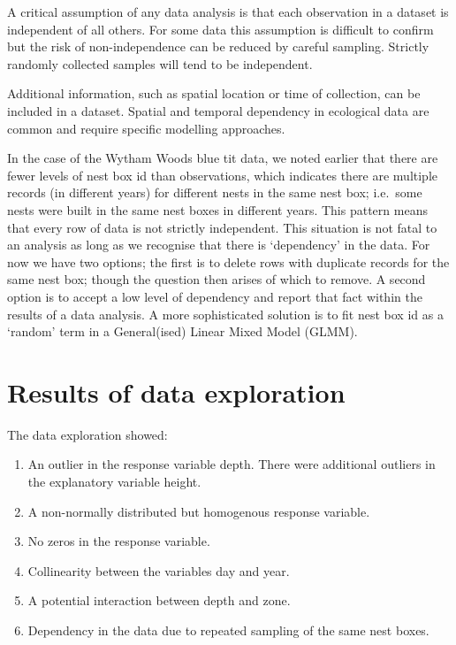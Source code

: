 \documentclass[
]{book}
\providecommand{\tightlist}{%
  \setlength{\itemsep}{0pt}\setlength{\parskip}{0pt}}
\begin{document}
A critical assumption of any data analysis is that each observation in a dataset is independent of all others. For some data this assumption is difficult to confirm but the risk of non-independence can be reduced by careful sampling. Strictly randomly collected samples will tend to be independent.

Additional information, such as spatial location or time of collection, can be included in a dataset. Spatial and temporal dependency in ecological data are common and require specific modelling approaches.

In the case of the Wytham Woods blue tit data, we noted earlier that there are fewer levels of nest box id than observations, which indicates there are multiple records (in different years) for different nests in the same nest box; i.e.~some nests were built in the same nest boxes in different years. This pattern means that every row of data is not strictly independent. This situation is not fatal to an analysis as long as we recognise that there is `dependency' in the data. For now we have two options; the first is to delete rows with duplicate records for the same nest box; though the question then arises of which to remove. A second option is to accept a low level of dependency and report that fact within the results of a data analysis. A more sophisticated solution is to fit nest box id as a `random' term in a General(ised) Linear Mixed Model (GLMM).

\hypertarget{results-of-data-exploration}{%
\section{Results of data exploration}\label{results-of-data-exploration}}

The data exploration showed:

\begin{enumerate}
\def\labelenumi{\arabic{enumi}.}
\tightlist
\item
  An outlier in the response variable depth. There were additional outliers in the explanatory variable height.
\item
  A non-normally distributed but homogenous response variable.
\item
  No zeros in the response variable.
\item
  Collinearity between the variables day and year.
\item
  A potential interaction between depth and zone.
\item
  Dependency in the data due to repeated sampling of the same nest boxes.
\end{enumerate}
\end{document}
